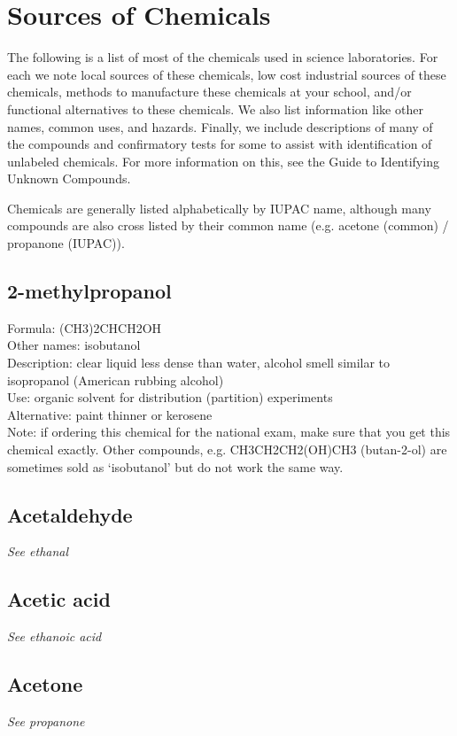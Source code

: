 \chapter{Sources of Chemicals}

The following is a list of most of the chemicals 
used in science laboratories. 
For each we note local sources of these chemicals, 
low cost industrial sources of these chemicals, 
methods to manufacture these chemicals at your school, 
and/or functional alternatives to these chemicals. 
We also list information like other names, 
common uses, 
and hazards. 
Finally, 
we include descriptions of many of the compounds 
and confirmatory tests for some to assist 
with identification of unlabeled chemicals. 
For more information on this, 
see the Guide to Identifying Unknown Compounds.

Chemicals are generally listed alphabetically by IUPAC name, 
although many compounds are also cross listed by their common name (e.g. 
acetone (common) / propanone (IUPAC)).

\section{2-methylpropanol}
Formula: (CH3)2CHCH2OH\\
Other names: isobutanol\\
Description: clear liquid less dense than water, 
alcohol smell similar to isopropanol (American rubbing alcohol)\\
Use: organic solvent for distribution (partition) experiments\\
Alternative: paint thinner or kerosene\\
Note: if ordering this chemical for the national exam, 
make sure that you get this chemical exactly. 
Other compounds, 
e.g. 
CH3CH2CH2(OH)CH3 (butan-2-ol) are sometimes sold 
as ‘isobutanol’ but do not work the same way.

\section{Acetaldehyde}
\textit{See ethanal}

\section{Acetic acid}
\textit{See ethanoic acid}

\section{Acetone}
\textit{See propanone}


